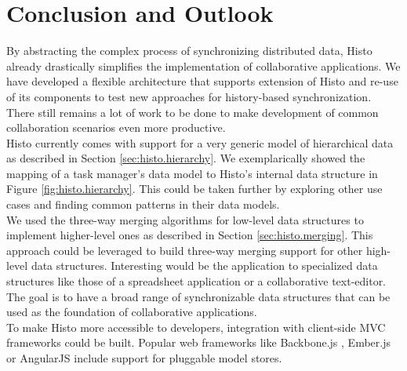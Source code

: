 \section{Conclusion and Outlook}
By abstracting the complex process of synchronizing distributed data, Histo already drastically simplifies the implementation of collaborative applications.
We have developed a flexible architecture that supports extension of Histo and re-use of its components to test new approaches for history-based synchronization.\\
There still remains a lot of work to be done to make development of common collaboration scenarios even more productive.\\
Histo currently comes with support for a very generic model of hierarchical data as described in Section \ref{sec:histo.hierarchy}.
We exemplarically showed the mapping of a task manager's data model to Histo's internal data structure in Figure \ref{fig:histo.hierarchy}.
This could be taken further by exploring other use cases and finding common patterns in their data models.\\
We used the three-way merging algorithms for low-level data structures to implement higher-level ones as described in Section \ref{sec:histo.merging}.
This approach could be leveraged to build three-way merging support for other high-level data structures.
Interesting would be the application to specialized data structures like those of a spreadsheet application or a collaborative text-editor.\\
The goal is to have a broad range of synchronizable data structures that can be used as the foundation of collaborative applications.\\
To make Histo more accessible to developers, integration with client-side MVC frameworks could be built.
Popular web frameworks like Backbone.js \cite{backbone}, Ember.js \cite{ember} or AngularJS \cite{angular} include support for pluggable model stores.
